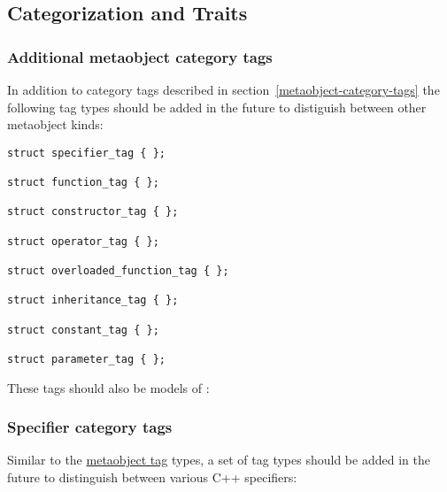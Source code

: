 \subsection{Categorization and Traits}

\subsubsection{Additional metaobject category tags}
\label{metaobject-category-tags-next}

In addition to category tags described in section~\ref{metaobject-category-tags}
the following tag types should be added in the future
to distiguish between other metaobject kinds:

\begin{verbatim}
struct specifier_tag { };

struct function_tag { };

struct constructor_tag { };

struct operator_tag { };

struct overloaded_function_tag { };

struct inheritance_tag { };

struct constant_tag { };

struct parameter_tag { };
\end{verbatim}

These tags should also be models of \verb@MetaobjectCategory@:

\subsubsection{Specifier category tags}
\label{specifier-category-tags}

Similar to the \hyperref[metaobject-category-tags]{metaobject tag} types,
a set of tag types should be added in the future
to distinguish between various C++ specifiers:

